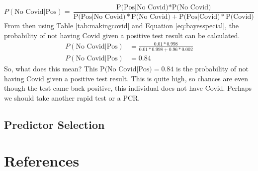 \documentclass[12pt,twoside]{reedthesis}
\begin{document}
\begin{equation}
P(\text{No Covid|Pos}) = \frac{\text{P(Pos|No Covid)} * \text{P(No Covid)}}{\text{P(Pos|No Covid)} * \text{P(No Covid)} + \text{P(Pos|Covid)} * \text{P(Covid)}}
\label{eq:bayesspecial}
\end{equation}
From then using Table \ref{tab:makingcovid} and Equation \eqref{eq:bayesspecial}, the probability of not having Covid given a positive test result can be calculated.
\begin{align}
P(\text{No Covid|Pos}) &= \frac{0.01 * 0.998}{0.01 * 0.998 + 0.96 * 0.002} \\
P(\text{No Covid|Pos}) &= 0.84
\label{eq:bayesmath2}
\end{align}
So, what does this mean? This \(\text{P(No Covid|Pos)} = 0.84\) is the probability of not having Covid given a positive test result. This is quite high, so chances are even though the test came back positive, this individual does not have Covid. Perhaps we should take another rapid test or a PCR.

\hypertarget{predselect}{%
\section{Predictor Selection}\label{predselect}}

\backmatter

\hypertarget{references}{%
\chapter*{References}\label{references}}


\noindent

\setlength{\parindent}{-0.20in}
\setlength{\leftskip}{0.20in}
\setlength{\parskip}{8pt}
\end{document}
